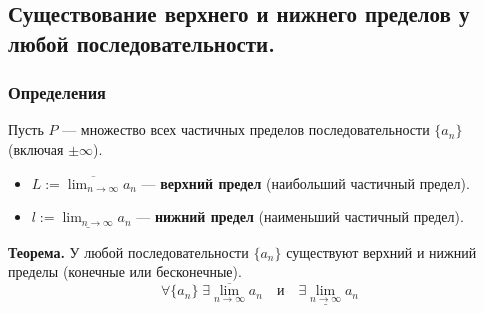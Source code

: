 \subsection{Существование верхнего и нижнего пределов у любой последовательности.}

\subsubsection*{Определения}
Пусть $P$ — множество всех частичных пределов последовательности $\{a_n\}$ (включая $\pm \infty$).
\begin{itemize}
    \item $L := \overline{\lim_{n\to\infty}} a_n$ — \textbf{верхний предел} (наибольший частичный предел).
    \item $l := \underline{\lim_{n\to\infty}} a_n$ — \textbf{нижний предел} (наименьший частичный предел).
\end{itemize}

\textbf{Теорема.} У любой последовательности $\{a_n\}$ существуют верхний и нижний пределы (конечные или бесконечные).
\[ \forall \{a_n\} \; \exists \overline{\lim_{n\to\infty}} a_n \quad \text{и} \quad \exists \underline{\lim_{n\to\infty}} a_n \]



